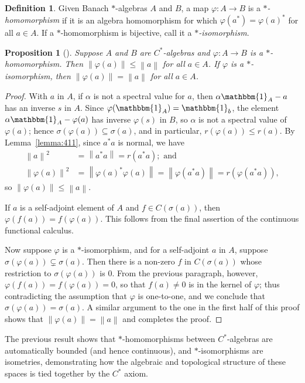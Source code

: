 \documentclass[11pt,a4paper]{report}
\theoremstyle{plain}
\newtheorem{prop}{Proposition}
\theoremstyle{definition}
\newtheorem{defn}{Definition}
\newcommand{\1}{\mathbbm{1}}
\renewcommand{\phi}{\varphi}
\newcommand{\spec}[1]{\sigma(#1)}
\begin{document}
\begin{defn}
	Given Banach $\ast$-algebras $A$ and $B$, a map $\phi:A\to B$ is a 
	\emph{$\ast$-homomorphism} if it is an algebra homomorphism for which 
	$\phi(a^\ast) = \phi(a)^\ast$ for all $a \in A$. If a $\ast$-homomorphism is 
	bijective, call it a \emph{$\ast$-isomorphism}.
\end{defn}
\begin{prop}[{\cite[4.1.8]{kadison83}}] \label{prop:homo}
	Suppose $A$ and $B$ are $C^\ast$-algebras and $\phi:A\to B$ is a 
	$\ast$-homomorphism. Then $\left\|\phi(a)\right\| \leq \left\|a\right\|$ for all 
	$a \in A$. If $\phi$ is a $\ast$-isomorphism, then $\left\|\phi(a)\right\| = 
	\left\|a\right\|$ for all $a \in A$.


\end{prop}
\begin{proof}
	With $a$ in $A$, if $\alpha$ is not a spectral value for $a$, then $\alpha\1_A-a$ has 
	an inverse $s$ in $A$. Since $\phi(\1_A) =\1_b$, the element $\alpha \1_A-\phi(a)$ 
	has inverse $\phi(s)$ in $B$, so $\alpha$ is not a spectral value of $\phi(a)$; 
	hence $\spec {\phi(a)}\subseteq \spec a$, and in particular, $r(\phi(a))\leq 
	r(a)$. By Lemma~\ref{lemma:411}, since $a^\ast a$ is normal, we have 
	\begin{align*}
		\left\|a\right\|^2			
					&=	\left\|a^\ast a\right\|   = 	r(a^\ast a);  \mbox{ and }			\\
		\left\|\phi(a)\right\|^2 &=\left\|\phi(a)^\ast\phi(a)\right\| = 
							 \left\|\phi(a^\ast a)\right\| = r(\phi(a^\ast a)),
	\end{align*}
	so $\left\|\phi(a)\right\|\leq \left\|a\right\|$.
	
	If $a$ is a self-adjoint element of $A$ and $f \in C(\spec a)$, then 
	$\phi(f(a))=f(\phi(a))$. This follows from the final assertion of the continuous 
	functional calculus.

	
	Now suppose $\phi$ is a $\ast$-isomorphism, and for a self-adjoint $a$ in $A$, 
	suppose $\spec{\phi(a)} \subsetneq \spec a$. Then there is a non-zero $f$ in 
	$C(\spec a)$ whose restriction to $\spec{\phi(a)}$ is 0. From the previous 
	paragraph, however, $\phi(f(a)) = f(\phi(a))=0$, so that $f(a)\not= 0$ is in the 
	kernel of $\phi$; thus contradicting the assumption that $\phi$ is one-to-one, 
	and we conclude that $\spec{\phi(a)} = \spec a$. A similar argument to the one 
	in the first half of this proof shows that $\left\|\phi(a)\right\| = 
	\left\|a\right\|$ and completes the proof.


\end{proof}
The previous result shows that $\ast$-homomorphisms between $C^\ast$-algebras are 
automatically bounded (and hence continuous), and $\ast$-isomorphisms are 
isometries, demonstrating how the algebraic and topological structure of these 
spaces is tied together by the $C^\ast$ axiom.
\end{document}
